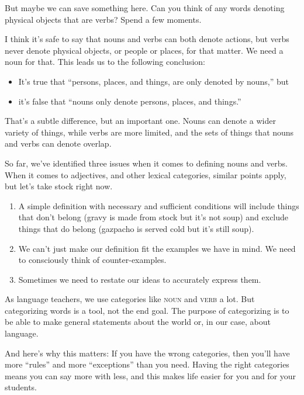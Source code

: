 But maybe we can save something here. Can you think of any words denoting physical objects that are verbs? Spend a few moments.

\bigskip

I think it's safe to say that nouns and verbs can both denote actions, but verbs never denote physical objects, or people or places, for that matter. We need a noun for that. This leads us to the following conclusion:
\begin{itemize}[noitemsep]
    \item It's true that ``persons, places, and things, are only denoted by nouns,'' but
    \item it's false that ``nouns only denote persons, places, and things.''
\end{itemize}
That's a subtle difference, but an important one. Nouns can denote a wider variety of things, while verbs are more limited, and the sets of things that nouns and verbs can denote overlap.

So far, we've identified three issues when it comes to defining nouns and verbs. When it comes to adjectives, and other lexical categories, similar points apply, but let's take stock right now.
\begin{enumerate}[noitemsep]
    \item A simple definition with necessary and sufficient conditions will include things that don't belong (gravy is made from stock but it's not soup) and exclude things that do belong (gazpacho is served cold but it's still soup).
    \item We can't just make our definition fit the examples we have in mind. We need to consciously think of counter-examples.
    \item Sometimes we need to restate our ideas to accurately express them.
\end{enumerate}

As language teachers, we use categories like \textsc{noun} and \textsc{verb} a lot. But categorizing words is a tool, not the end goal. The purpose of categorizing is to be able to make general statements about the world or, in our case, about language.

And here's why this matters: If you have the wrong categories, then you'll have more ``rules'' and more ``exceptions'' than you need. Having the right categories means you can say more with less, and this makes life easier for you and for your students.

